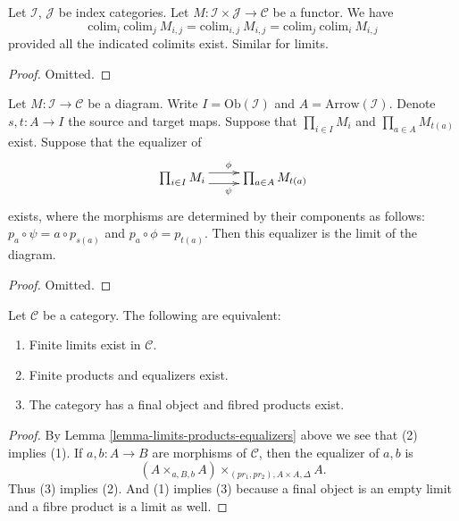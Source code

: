\begin{lemma}
\label{lemma-colimits-commute}
Let $\mathcal{I}$, $\mathcal{J}$ be index categories.
Let $M : \mathcal{I} \times \mathcal{J} \to \mathcal{C}$ be a functor.
We have
$$
\text{colim}_i\ \text{colim}_j\ M_{i,j}
=
\text{colim}_{i,j}\ M_{i,j}
=
\text{colim}_j\ \text{colim}_i\ M_{i,j}
$$
provided all the indicated colimits exist. Similar for limits.
\end{lemma}

\begin{proof}
Omitted.
\end{proof}

\begin{lemma}
\label{lemma-limits-products-equalizers}
Let $M : \mathcal{I} \to \mathcal{C}$ be a diagram.
Write $I = \text{Ob}(\mathcal{I})$ and $A = \text{Arrow}(\mathcal{I})$.
Denote $s,t : A \to I$ the source and target maps.
Suppose that $\prod_{i \in I} M_i$ and $\prod_{a \in A} M_{t(a)}$
exist. Suppose that the equalizer of 
$$
\xymatrix{
\prod_{i \in I} M_i
\ar@<1ex>[r]^\phi \ar@<-1ex>[r]_\psi
&
\prod_{a \in A} M_{t(a)}
}
$$
exists, where the morphisms are determined by their components
as follows: $p_a \circ \psi = a \circ p_{s(a)}$
and $p_a \circ \phi = p_{t(a)}$. Then this equalizer is the
limit of the diagram.
\end{lemma}

\begin{proof}
Omitted.
\end{proof}

\begin{lemma}
\label{lemma-finite-limits-exist}
Let $\mathcal{C}$ be a category.
The following are equivalent:
\begin{enumerate}
\item Finite limits exist in $\mathcal{C}$.
\item Finite products and equalizers exist.
\item The category has a final object and fibred products exist.
\end{enumerate}
\end{lemma}

\begin{proof}
By Lemma \ref{lemma-limits-products-equalizers}
above we see that (2) implies (1).
If $a, b : A \to B$ are morphisms of $\mathcal{C}$, then the
equalizer of $a, b$ is
$$
(A \times_{a, B, b} A)\times_{(pr_1, pr_2), A \times A, \Delta} A.
$$
Thus (3) implies (2). And (1) implies (3) because a final object
is an empty limit and a fibre product is a limit as well.
\end{proof}

